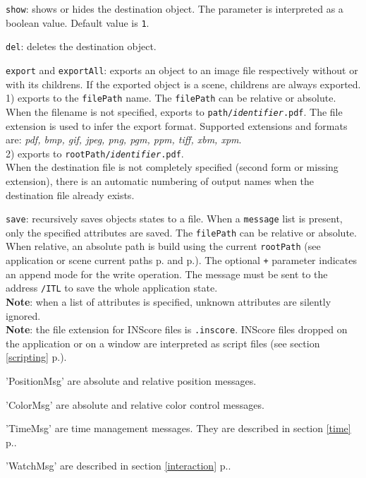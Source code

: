 \documentclass[a4paper,twoside]{report}
\newcommand{\fullref}[1]	{\ref{#1} p.\pageref{#1}}
\newcommand{\OSC}[1]		{\texttt{#1}}
\newcommand{\values}[1]		{\texttt{#1}}
\let\olditemize\itemize
\let\oldenditemize\enditemize
\renewenvironment{itemize} 	{\olditemize \setlength{\itemsep}{1mm}}{\oldenditemize}
\begin{document}
\begin{itemize}
\item \OSC{show}: shows or hides the destination object. The parameter is interpreted as a boolean value. Default value is \values{1}. 
\item \OSC{del}: deletes the destination object. 

\item \OSC{export} and \OSC{exportAll}: exports an object to an image file respectively without or with its childrens. If the exported object is a scene, childrens are always exported.\\
1) exports to the \OSC{filePath} name. The \OSC{filePath} can be relative or absolute. When the filename is not specified, exports to \OSC{path/\textit{identifier}.pdf}. The file extension is used to infer the export format. Supported extensions and formats are: \emph{pdf, bmp, gif, jpeg, png, pgm, ppm, tiff, xbm, xpm}. \\
2) exports to \OSC{rootPath/\textit{identifier}.pdf}.\\
When the destination file is not completely specified (second form or missing extension), there is an automatic numbering of output names when the destination file already exists. \\ 

\item \OSC{save}: recursively saves objects states to a file. When a \OSC{message} list is present, only the specified attributes are saved. The \OSC{filePath} can be relative or absolute. When relative, an absolute path is build using the current \OSC{rootPath} (see application or scene current paths  p.\pageref{applmgmt} and  p.\pageref{scene}). The optional \OSC{+} parameter indicates an append mode for the write operation. The message must be sent to the address \OSC{/ITL} to save the whole application state.\\
\textbf{Note}: when a list of attributes is specified, unknown attributes are silently ignored. \\
\textbf{Note}: the file extension for INScore files is \OSC{.inscore}. INScore files dropped on the application or on a window are interpreted as script files (see section \fullref{scripting}).

\item 'PositionMsg' are absolute and relative position messages.
\item 'ColorMsg' are absolute and relative color control messages.
\item 'TimeMsg' are time management messages. They are described in section \fullref{time}.
\item 'WatchMsg' are described in section \fullref{interaction}.
\end{itemize}
\end{document}
